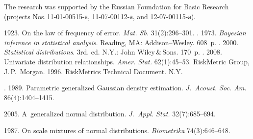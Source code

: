 

\vspace*{-14pt}

\Ack
\noindent
The research was supported by the Russian Foundation for Basic Research (projects 
Nos.\,11-01-00515-а, 11-07-00112-а, and 12-07-00115-а).

  \begin{multicols}{2}

\renewcommand{\bibname}{\protect\rmfamily References}

{\small\frenchspacing
{%
\begin{thebibliography}{99}


 1923. 
On the law of frequency of error. 
\textit{Mat. Sb.}  31(2):296--301.
.  1973.
\textit{Bayesian inference in statistical analysis}.
Reading, MA: Addison--Wesley. 608~p.
.  2000.
\textit{Statistical distributions}. 3rd. ed.  N.Y.: John Wiley\,\&\,Sons. 170~p.
. 2008.
Univariate distribution relationships. \textit{Amer. Stat.} 62(1):45--53.
RiskMetric Group, J.\,P.~Morgan.
1996. {RiskMetrics Technical Document}.  N.Y. 
\columnbreak

. 
1989. Parametric generalized Gaussian density estimation.
\textit{J.~Acoust. Soc. Am.} 86(4):1404--1415.

\vspace*{1pt}

 2005.
A~generalized normal distribution. \textit{J.~Appl. Stat.} 32(7):685--694.

\vspace*{1pt}

 1987.
On scale mixtures of normal distributions. \textit{Biometrika} 74(3):646--648.


\end{thebibliography}}}
\end{multicols}
